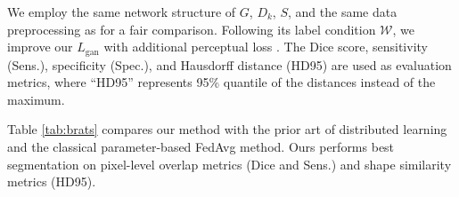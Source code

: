 \documentclass[letterpaper]{article} %
\newcommand{\domw}{\mathcal{W}}
\begin{document}
We employ the same network structure of $G$, $D_k$, $S$, and the same data preprocessing as \cite{chang2020synthetic} for a fair comparison. Following its label condition $\domw$, we improve our $L_\text{gan}$ with additional perceptual loss \cite{johnson2016perceptual}.  
The Dice score, sensitivity (Sens.), specificity (Spec.), and Hausdorff distance (HD95) are used as evaluation metrics, where ``HD95'' represents 95\% quantile of the distances instead of the maximum.


Table \ref{tab:brats} compares our method with the prior art of distributed learning \cite{chang2020synthetic} and the classical parameter-based FedAvg method. Ours performs best segmentation on pixel-level overlap metrics (Dice and Sens.) and shape similarity metrics (HD95). 
\end{document}
